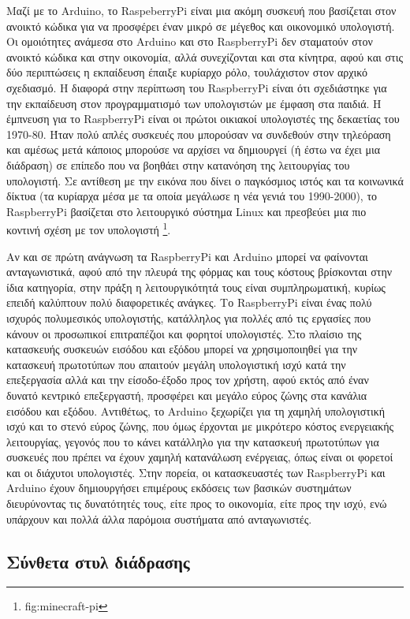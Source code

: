 \documentclass[
]{article}
\begin{document}
Μαζί με το Arduino, το RaspeberryPi είναι μια ακόμη συσκευή που
βασίζεται στον ανοικτό κώδικα για να προσφέρει έναν μικρό σε μέγεθος και
οικονομικό υπολογιστή. Οι ομοιότητες ανάμεσα στο Arduino και στο
RaspberryPi δεν σταματούν στον ανοικτό κώδικα και στην οικονομία, αλλά
συνεχίζονται και στα κίνητρα, αφού και στις δύο περιπτώσεις η εκπαίδευση
έπαιξε κυρίαρχο ρόλο, τουλάχιστον στον αρχικό σχεδιασμό. Η διαφορά στην
περίπτωση του RaspberryPi είναι ότι σχεδιάστηκε για την εκπαίδευση στον
προγραμματισμό των υπολογιστών με έμφαση στα παιδιά. Η έμπνευση για το
RaspberryPi είναι οι πρώτοι οικιακοί υπολογιστές της δεκαετίας του
1970-80. Ήταν πολύ απλές συσκευές που μπορούσαν να συνδεθούν στην
τηλεόραση και αμέσως μετά κάποιος μπορούσε να αρχίσει να δημιουργεί (ή
έστω να έχει μια διάδραση) σε επίπεδο που να βοηθάει στην κατανόηση της
λειτουργίας του υπολογιστή. Σε αντίθεση με την εικόνα που δίνει ο
παγκόσμιος ιστός και τα κοινωνικά δίκτυα (τα κυρίαρχα μέσα με τα οποία
μεγάλωσε η νέα γενιά του 1990-2000), το RaspberryPi βασίζεται στο
λειτουργικό σύστημα Linux και πρεσβεύει μια πιο κοντινή σχέση με τον
υπολογιστή \footnote{fig:minecraft-pi}.

Αν και σε πρώτη ανάγνωση τα RaspberryPi και Arduino μπορεί να φαίνονται
ανταγωνιστικά, αφού από την πλευρά της φόρμας και τους κόστους
βρίσκονται στην ίδια κατηγορία, στην πράξη η λειτουργικότητά τους είναι
συμπληρωματική, κυρίως επειδή καλύπτουν πολύ διαφορετικές ανάγκες. Το
RaspberryPi είναι ένας πολύ ισχυρός πολυμεσικός υπολογιστής, κατάλληλος
για πολλές από τις εργασίες που κάνουν οι προσωπικοί επιτραπέζιοι και
φορητοί υπολογιστές. Στο πλαίσιο της κατασκευής συσκευών εισόδου και
εξόδου μπορεί να χρησιμοποιηθεί για την κατασκευή πρωτοτύπων που
απαιτούν μεγάλη υπολογιστική ισχύ κατά την επεξεργασία αλλά και την
είσοδο-έξοδο προς τον χρήστη, αφού εκτός από έναν δυνατό κεντρικό
επεξεργαστή, προσφέρει και μεγάλο εύρος ζώνης στα κανάλια εισόδου και
εξόδου. Αντιθέτως, το Arduino ξεχωρίζει για τη χαμηλή υπολογιστική ισχύ
και το στενό εύρος ζώνης, που όμως έρχονται με μικρότερο κόστος
ενεργειακής λειτουργίας, γεγονός που το κάνει κατάλληλο για την
κατασκευή πρωτοτύπων για συσκευές που πρέπει να έχουν χαμηλή κατανάλωση
ενέργειας, όπως είναι οι φορετοί και οι διάχυτοι υπολογιστές. Στην
πορεία, οι κατασκευαστές των RaspberryPi και Arduino έχουν δημιουργήσει
επιμέρους εκδόσεις των βασικών συστημάτων διευρύνοντας τις δυνατότητές
τους, είτε προς το οικονομία, είτε προς την ισχύ, ενώ υπάρχουν και πολλά
άλλα παρόμοια συστήματα από ανταγωνιστές.

\hypertarget{ux3c3ux3cdux3bdux3b8ux3b5ux3c4ux3b1-ux3c3ux3c4ux3c5ux3bb-ux3b4ux3b9ux3acux3b4ux3c1ux3b1ux3c3ux3b7ux3c2}{%
\subsection{Σύνθετα στυλ
διάδρασης}\label{ux3c3ux3cdux3bdux3b8ux3b5ux3c4ux3b1-ux3c3ux3c4ux3c5ux3bb-ux3b4ux3b9ux3acux3b4ux3c1ux3b1ux3c3ux3b7ux3c2}}
\end{document}
